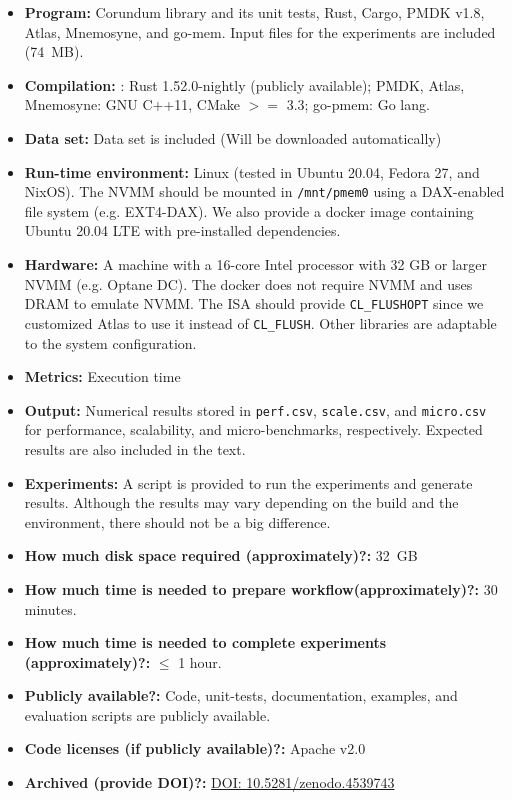 {\small
\begin{itemize}
  \item {\bf Program: } Corundum library and its unit tests, Rust, Cargo, PMDK v1.8, Atlas, Mnemosyne, and go-mem. Input files for the experiments are included (74~MB).
  \item {\bf Compilation: } \This{}: Rust 1.52.0-nightly (publicly available); PMDK, Atlas, Mnemosyne: GNU C++11, CMake $>=$ 3.3; go-pmem: Go lang.
  \item {\bf Data set: } Data set is included (Will be downloaded automatically)
  \item {\bf Run-time environment: } Linux (tested in Ubuntu 20.04, Fedora 27, and NixOS). The NVMM should be mounted in \verb+/mnt/pmem0+ using a DAX-enabled file system (e.g. EXT4-DAX). We also provide a docker image containing Ubuntu 20.04 LTE with pre-installed dependencies.
  \item {\bf Hardware: } A machine with a 16-core Intel processor with 32 GB or larger NVMM (e.g. Optane DC). The docker does not require NVMM and uses DRAM to emulate NVMM. The ISA should provide \verb+CL_FLUSHOPT+ since we customized Atlas to use it instead of \verb+CL_FLUSH+. Other libraries are adaptable to the system configuration.
  \item {\bf Metrics: } Execution time
  \item {\bf Output: } Numerical results stored in \verb+perf.csv+, \verb+scale.csv+, and \verb+micro.csv+ for performance, scalability, and micro-benchmarks, respectively. Expected results are also included in the text.
  \item {\bf Experiments: } A script is provided to run the experiments and generate results. Although the results may vary depending on the build and the environment, there should not be a big difference.
  \item {\bf How much disk space required (approximately)?: } 32~GB
  \item {\bf How much time is needed to prepare workflow\linebreak(approximately)?: } 30 minutes.
  \item {\bf How much time is needed to complete experiments (approximately)?: } $\leq$ 1 hour.
  \item {\bf Publicly available?: } Code, unit-tests, documentation, examples, and evaluation scripts are publicly available.
  \item {\bf Code licenses (if publicly available)?: } Apache v2.0
  \item {\bf Archived (provide DOI)?: } \href{https://zenodo.org/record/4539743}{DOI: 10.5281/zenodo.4539743}
\end{itemize}

}
